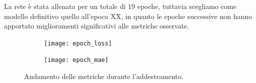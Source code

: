 La rete è stata allenata per un totale di $19$ epoche, tuttavia scegliamo come modello definitivo quello all'epoca XX, in quanto le epoche successive non hanno apportato miglioramenti significativi alle metriche osservate. 

\begin{figure}[ht]
	\centering
	\hfill
	\begin{subfigure}[b]{0.47\textwidth}
		\centering
		\texttt{[image: epoch\_loss]}
	\end{subfigure}
	\hfill
	\begin{subfigure}[b]{0.47\textwidth}
		\centering
		\texttt{[image: epoch\_mae]}
	\end{subfigure}
	\hfill
	\caption{Andamento delle metriche durante l'addestramento.}
\end{figure}
